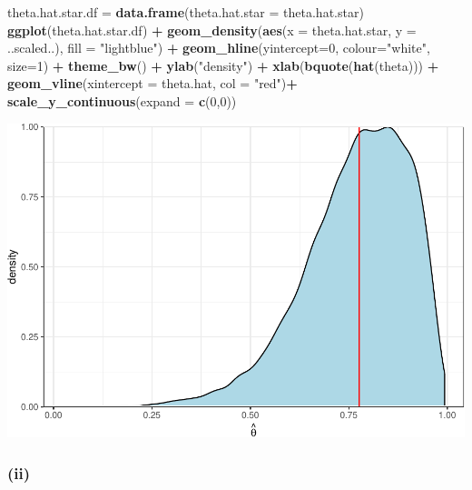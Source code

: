 \documentclass[]{article}
\newenvironment{Shaded}{\begin{snugshade}}{\end{snugshade}}
\newcommand{\DataTypeTok}[1]{\textcolor[rgb]{0.13,0.29,0.53}{#1}}
\newcommand{\DecValTok}[1]{\textcolor[rgb]{0.00,0.00,0.81}{#1}}
\newcommand{\KeywordTok}[1]{\textcolor[rgb]{0.13,0.29,0.53}{\textbf{#1}}}
\newcommand{\NormalTok}[1]{#1}
\newcommand{\OperatorTok}[1]{\textcolor[rgb]{0.81,0.36,0.00}{\textbf{#1}}}
\newcommand{\StringTok}[1]{\textcolor[rgb]{0.31,0.60,0.02}{#1}}
\begin{document}
\begin{Shaded}
\begin{Highlighting}[]
\NormalTok{theta.hat.star.df =}\StringTok{ }\KeywordTok{data.frame}\NormalTok{(}\DataTypeTok{theta.hat.star =}\NormalTok{ theta.hat.star)}
\KeywordTok{ggplot}\NormalTok{(theta.hat.star.df) }\OperatorTok{+}
\StringTok{  }\KeywordTok{geom_density}\NormalTok{(}\KeywordTok{aes}\NormalTok{(}\DataTypeTok{x =}\NormalTok{ theta.hat.star, }\DataTypeTok{y =}\NormalTok{ ..scaled..),}
    \DataTypeTok{fill =} \StringTok{"lightblue"}\NormalTok{) }\OperatorTok{+}
\StringTok{  }\KeywordTok{geom_hline}\NormalTok{(}\DataTypeTok{yintercept=}\DecValTok{0}\NormalTok{, }\DataTypeTok{colour=}\StringTok{"white"}\NormalTok{, }\DataTypeTok{size=}\DecValTok{1}\NormalTok{) }\OperatorTok{+}
\StringTok{  }\KeywordTok{theme_bw}\NormalTok{() }\OperatorTok{+}
\StringTok{  }\KeywordTok{ylab}\NormalTok{(}\StringTok{"density"}\NormalTok{) }\OperatorTok{+}
\StringTok{  }\KeywordTok{xlab}\NormalTok{(}\KeywordTok{bquote}\NormalTok{(}\KeywordTok{hat}\NormalTok{(theta))) }\OperatorTok{+}
\StringTok{  }\KeywordTok{geom_vline}\NormalTok{(}\DataTypeTok{xintercept =}\NormalTok{ theta.hat, }\DataTypeTok{col =} \StringTok{"red"}\NormalTok{)}\OperatorTok{+}
\StringTok{  }\KeywordTok{scale_y_continuous}\NormalTok{(}\DataTypeTok{expand =} \KeywordTok{c}\NormalTok{(}\DecValTok{0}\NormalTok{,}\DecValTok{0}\NormalTok{))}
\end{Highlighting}
\end{Shaded}

\includegraphics{homework_3_files/figure-latex/unnamed-chunk-1-1.pdf}

\hypertarget{ii}{%
\subsubsection{(ii)}\label{ii}}
\end{document}
